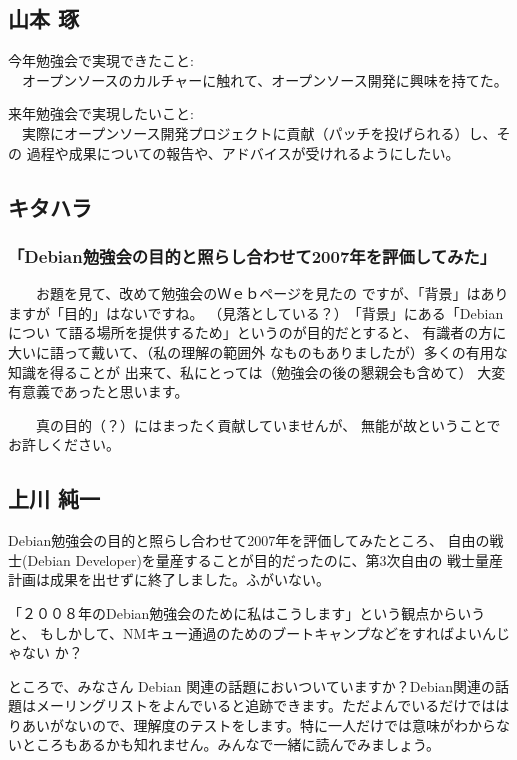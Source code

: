 \documentclass[mingoth,a4paper]{jsarticle}
\begin{document}
\subsection{山本 琢}

今年勉強会で実現できたこと:\\
　オープンソースのカルチャーに触れて、オープンソース開発に興味を持てた。

来年勉強会で実現したいこと:\\
　実際にオープンソース開発プロジェクトに貢献（パッチを投げられる）し、その
過程や成果についての報告や、アドバイスが受けれるようにしたい。

\subsection{キタハラ}

\subsubsection{「Debian勉強会の目的と照らし合わせて2007年を評価してみた」}

　　お題を見て、改めて勉強会のＷｅｂページを見たの
ですが、「背景」はありますが「目的」はないですね。
（見落としている？）　「背景」にある「Debian につい
て語る場所を提供するため」というのが目的だとすると、
有識者の方に大いに語って戴いて、（私の理解の範囲外
なものもありましたが）多くの有用な知識を得ることが
出来て、私にとっては（勉強会の後の懇親会も含めて）
大変有意義であったと思います。

　　真の目的（？）にはまったく貢献していませんが、
無能が故ということでお許しください。

\subsection{上川 純一}

Debian勉強会の目的と照らし合わせて2007年を評価してみたところ、
自由の戦士(Debian Developer)を量産することが目的だったのに、第3次自由の
戦士量産計画は成果を出せずに終了しました。ふがいない。

「２００８年のDebian勉強会のために私はこうします」という観点からいうと、
もしかして、NMキュー通過のためのブートキャンプなどをすればよいんじゃない
か？


ところで、みなさん Debian 関連の話題においついていますか？Debian関連の話
題はメーリングリストをよんでいると追跡できます。ただよんでいるだけではは
りあいがないので、理解度のテストをします。特に一人だけでは意味がわからな
いところもあるかも知れません。みんなで一緒に読んでみましょう。
\end{document}
